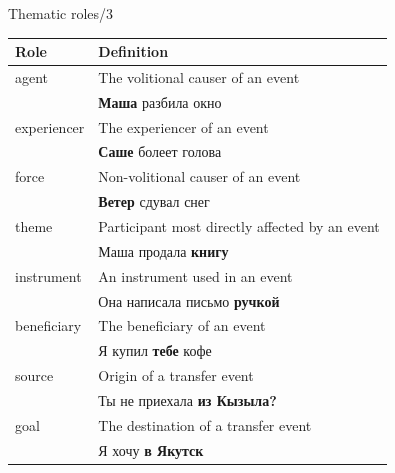\documentclass[10pt, compress]{beamer}
\begin{document}
\begin{frame}{Thematic roles/3}

\begin{center}
\begin{small}
\begin{tabular}{ll}
  \textbf{Role} & \textbf{Definition} \\
 \hline
  {\sc agent}  & The volitional causer of an event \\
               & \textbf{Маша} разбила окно \\
  {\sc experiencer} & The experiencer of an event  \\
                    & \textbf{Саше} болеет голова \\
  {\sc force} & Non-volitional causer of an event  \\
              & \textbf{Ветер} сдувал снег \\ 
  {\sc theme} & Participant most directly affected by an event  \\
              & Маша продала \textbf{книгу} \\
  {\sc instrument} & An instrument used in an event \\
                 & Она написала письмо \textbf{ручкой} \\
  {\sc beneficiary} & The beneficiary of an event \\
                 & Я купил \textbf{тебе} кофе \\
  {\sc source} & Origin of a transfer event \\
              & Ты не приехала \textbf{из Кызыла?} \\
  {\sc goal} & The destination of a transfer event \\
               & Я хочу \textbf{в Якутск} \\
 \hline
\end{tabular} 
\end{small}
\end{center}

\end{frame}
\end{document}
